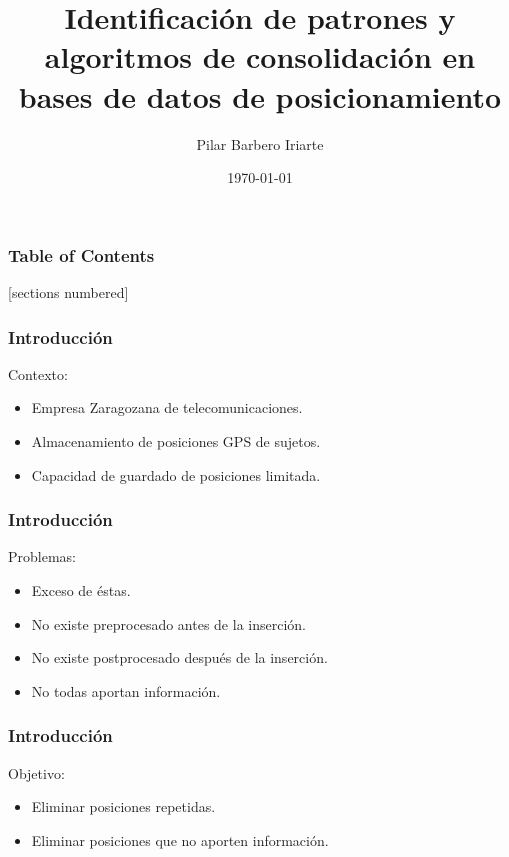 \documentclass[10pt, spanish]{beamer}
\title{Identificaci\'on de patrones y algoritmos de consolidaci\'on en bases de datos de posicionamiento}
\date{\today}
\author{Pilar Barbero Iriarte}
\institute{Universidad de Zaragoza}
\begin{document}
\maketitle

\begin{frame}
  \frametitle{Table of Contents}
  [sections numbered]
  \tableofcontents[hideallsubsections]
\end{frame}


\begin{frame}[fragile]
\frametitle{Introducci\'on}
Contexto: 
\begin{itemize}
	\item Empresa Zaragozana de telecomunicaciones.
	\item Almacenamiento de posiciones GPS de sujetos.
	\item Capacidad de guardado de posiciones limitada.
\end{itemize}
\end{frame}


\begin{frame}[fragile]
\frametitle{Introducci\'on}
Problemas:
	\begin{itemize}
		\item Exceso de \'estas.
		\item No existe preprocesado antes de la inserci\'on.
		\item No existe postprocesado despu\'es de la inserci\'on.
		\item No todas aportan informaci\'on.
	\end{itemize}
\end{frame}

\begin{frame}[fragile]
  \frametitle{Introducci\'on}
  Objetivo:
  \begin{itemize}
  	  \item Eliminar posiciones repetidas.
  	  \item Eliminar posiciones que no aporten informaci\'on.
   \end{itemize}
\end{frame}

\end{document}

